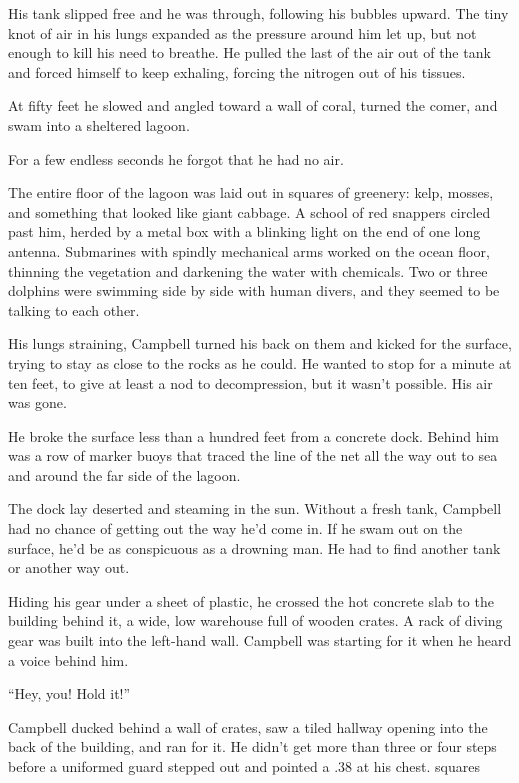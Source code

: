 His tank slipped free and he was through, following his bubbles upward. The tiny knot of air in his lungs expanded as the pressure around him let up, but not enough to kill his need to breathe. He pulled the last of the air out of the tank and forced himself to keep exhaling, forcing the nitrogen out of his tissues.

At fifty feet he slowed and angled toward a wall of coral, turned the comer, and swam into a sheltered lagoon.

For a few endless seconds he forgot that he had no air.

The entire floor of the lagoon was laid out in squares of greenery: kelp, mosses, and something that looked like giant cabbage. A school of red snappers circled past him, herded by a metal box with a blinking light on the end of one long antenna. Submarines with spindly mechanical arms worked on the ocean floor, thinning the vegetation and darkening the water with chemicals. Two or three dolphins were swimming side by side with human divers, and they seemed to be talking to each other.

His lungs straining, Campbell turned his back on them and kicked for the surface, trying to stay as close to the rocks as he could. He wanted to stop for a minute at ten feet, to give at least a nod to decompression, but it wasn't possible. His air was gone.

He broke the surface less than a hundred feet from a concrete dock. Behind him was a row of marker buoys that traced the line of the net all the way out to sea and around the far side of the lagoon.

The dock lay deserted and steaming in the sun. Without a fresh tank, Campbell had no chance of getting out the way he'd come in. If he swam out on the surface, he'd be as conspicuous as a drowning man. He had to find another tank or another way out.

Hiding his gear under a sheet of plastic, he crossed the hot concrete slab to the building behind it, a wide, low warehouse full of wooden crates. A rack of diving gear was built into the left-hand wall. Campbell was starting for it when he heard a voice behind him.

``Hey, you! Hold it!''

Campbell ducked behind a wall of crates, saw a tiled hallway opening into the back of the building, and ran for it. He didn't get more than three or four steps before a uniformed guard stepped out and pointed a .38 at his chest.
squares

